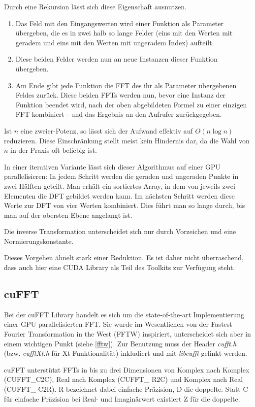 		Durch eine Rekursion lässt sich diese Eigenschaft ausnutzen.
		\begin{enumerate}
		    \item Das Feld mit den Eingangswerten wird einer Funktion als Parameter übergeben, die es in zwei halb so lange Felder (eins mit den Werten mit geradem und eins mit den Werten mit ungeradem Index) aufteilt.
    \item Diese beiden Felder werden nun an neue Instanzen dieser Funktion übergeben.
    \item Am Ende gibt jede Funktion die FFT des ihr als Parameter übergebenen Feldes zurück. Diese beiden FFTs werden nun, bevor eine Instanz der Funktion beendet wird, nach der oben abgebildeten Formel zu einer einzigen FFT kombiniert - und das Ergebnis an den Aufrufer zurückgegeben.
		\end{enumerate}
		Ist $n$ eine zweier-Potenz, so lässt sich der Aufwand effektiv auf $O(n\log n)$ reduzieren. Diese Einschränkung stellt meist kein Hindernis dar, da die Wahl von $n$ in der Praxis oft beliebig ist.
		
		In einer iterativen Variante lässt sich dieser Algorithmus auf einer GPU parallelisieren: In jedem Schritt werden die geraden und ungeraden Punkte in zwei Hälften geteilt. Man erhält ein sortiertes Array, in dem von jeweils zwei Elementen die DFT gebildet werden kann. Im nächsten Schritt werden diese Werte zur DFT von vier Werten kombiniert. Dies führt man so lange durch, bis man auf der obersten Ebene angelangt ist. 
		
		Die inverse Transformation unterscheidet sich nur durch Vorzeichen und eine Normierungskonstante.
		
		Dieses Vorgehen ähnelt stark einer Reduktion. Es ist daher nicht überraschend, dass auch hier eine CUDA Library als Teil des Toolkits zur Verfügung steht.
		
		\subsection{cuFFT}
		Bei der cuFFT Library handelt es sich um die state-of-the-art Implementierung einer GPU parallelisierten FFT. Sie wurde im Wesentlichen von der Fastest Fourier Transformation in the West (FFTW) inspiriert, unterscheidet sich aber in einem wichtigen Punkt (siehe \ref{fftw}). Zur Benutzung muss der Header \textit{cufft.h} (bzw. \textit{cufftXt.h} für Xt Funktionalität) inkludiert und mit \textit{libcufft} gelinkt werden.
		
		cuFFT unterstützt FFTs in bis zu drei Dimensionen von Komplex nach Komplex (CUFFT{\_}C2C), Real nach Komplex (CUFFT\_ R2C) und Komplex nach Real (CUFFT\_ C2R). R bezeichnet dabei einfache Präzision, D die doppelte. Statt C für einfache Präzision bei Real- und Imaginärwert existiert Z für die doppelte.
	
